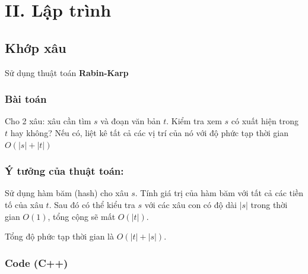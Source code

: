 \documentclass[
]{article}
\begin{document}
\hypertarget{ii.-lux1eadp-truxecnh}{%
\section{II. Lập trình}\label{ii.-lux1eadp-truxecnh}}

\hypertarget{khux1edbp-xuxe2u}{%
\subsection{Khớp xâu}\label{khux1edbp-xuxe2u}}

Sử dụng thuật toán \textbf{Rabin-Karp}

\hypertarget{buxe0i-touxe1n}{%
\subsubsection{Bài toán}\label{buxe0i-touxe1n}}

Cho 2 xâu: xâu cần tìm \(s\) và đoạn văn bản \(t\). Kiểm tra xem \(s\)
có xuất hiện trong \(t\) hay không? Nếu có, liệt kê tất cả các vị trí
của nó với độ phức tạp thời gian \(O(|s| + |t|)\)

\hypertarget{uxfd-tux1b0ux1edfng-cux1ee7a-thuux1eadt-touxe1n}{%
\subsubsection{Ý tưởng của thuật
toán:}\label{uxfd-tux1b0ux1edfng-cux1ee7a-thuux1eadt-touxe1n}}

Sử dụng hàm băm (hash) cho xâu \(s\). Tính giá trị của hàm băm với tất
cả các tiền tố của xâu \(t\). Sau đó có thể kiểu tra \(s\) với các xâu
con có độ dài \(|s|\) trong thời gian \(O(1)\), tổng cộng sẽ mất
\(O(|t|)\).

Tổng độ phức tạp thời gian là \(O(|t|+|s|)\).

\hypertarget{code-c}{%
\subsubsection{Code (C++)}\label{code-c}}
\end{document}
